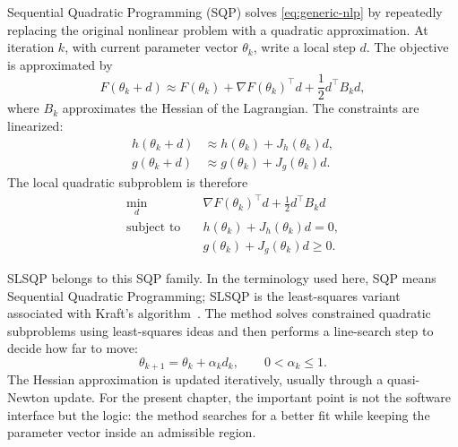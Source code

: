 Sequential Quadratic Programming (SQP) solves \eqref{eq:generic-nlp} by repeatedly replacing the original nonlinear problem with a quadratic approximation. At iteration \(k\), with current parameter vector \(\theta_k\), write a local step \(d\). The objective is approximated by
\begin{equation}
    F(\theta_k+d)
    \approx
    F(\theta_k)
    + \nabla F(\theta_k)^\top d
    + \frac{1}{2} d^\top B_k d,
\end{equation}
where \(B_k\) approximates the Hessian of the Lagrangian. The constraints are linearized:
\begin{align}
    h(\theta_k+d)
    &\approx h(\theta_k)+J_h(\theta_k)d,\\
    g(\theta_k+d)
    &\approx g(\theta_k)+J_g(\theta_k)d.
\end{align}
The local quadratic subproblem is therefore
\begin{align}
    \min_d \quad &
    \nabla F(\theta_k)^\top d
    + \frac{1}{2}d^\top B_kd
    \\
    \text{subject to}\quad &
    h(\theta_k)+J_h(\theta_k)d=0, \nonumber\\
    &
    g(\theta_k)+J_g(\theta_k)d\geq0. \nonumber
\end{align}

SLSQP belongs to this SQP family. In the terminology used here, SQP means Sequential Quadratic Programming; SLSQP is the least-squares variant associated with Kraft's algorithm~\cite{Kraft1988}. The method solves constrained quadratic subproblems using least-squares ideas and then performs a line-search step to decide how far to move:
\begin{equation}
    \theta_{k+1} = \theta_k+\alpha_k d_k,\qquad 0<\alpha_k\leq1.
\end{equation}
The Hessian approximation is updated iteratively, usually through a quasi-Newton update. For the present chapter, the important point is not the software interface but the logic: the method searches for a better fit while keeping the parameter vector inside an admissible region.

\vspace{0.5cm}



